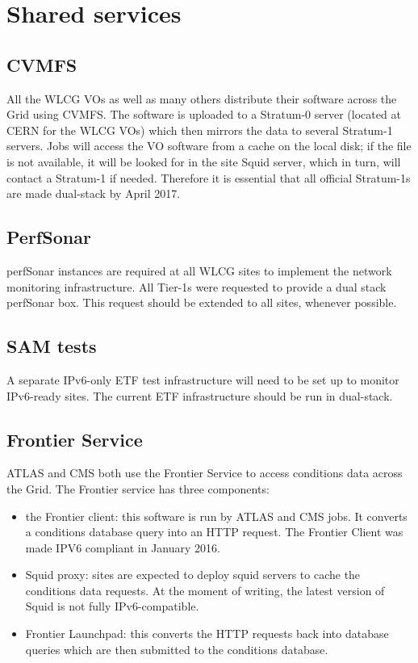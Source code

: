 
\section{Shared services}
\subsection{CVMFS}
All the WLCG VOs as well as many others distribute their software
across the Grid using CVMFS. The software is uploaded to a Stratum-0
server (located at CERN for the WLCG VOs) which then mirrors the data
to several Stratum-1 servers.  Jobs will access the VO software from a
cache on the local disk; if the file is not available, it will be
looked for in the site Squid server, which in turn, will contact a
Stratum-1 if needed.  Therefore it is essential that all official
Stratum-1s \cite{Stratum1} are made dual-stack by April 2017.

\subsection{PerfSonar}
perfSonar instances are required at all WLCG sites to implement the
network monitoring infrastructure. All Tier-1s were requested to
provide a dual stack perfSonar box. This request should be extended
to all sites, whenever possible.

\subsection{SAM tests}
A separate IPv6-only ETF test infrastructure will need to be set up to
monitor IPv6-ready sites. The current ETF infrastructure should be run
in dual-stack.

\subsection{Frontier Service}
ATLAS and CMS both use the Frontier Service\cite{Frontier} to access
conditions data across the Grid. The Frontier service has three
components:
\begin{itemize}
\item the Frontier client: this software is run by ATLAS and CMS
  jobs. It converts a conditions database query into an HTTP request.
  The Frontier Client was made IPV6 compliant in January 2016.
\item Squid proxy: sites are expected to deploy squid servers to cache
  the conditions data requests. At the moment of writing, the latest
  version of Squid is not fully IPv6-compatible.
\item Frontier Launchpad: this converts the HTTP requests back into
  database queries which are then submitted to the conditions
  database.
\end{itemize}

